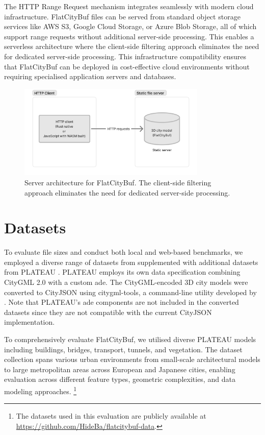 The HTTP Range Request mechanism integrates seamlessly with modern cloud infrastructure. FlatCityBuf files can be served from standard object storage services like AWS S3, Google Cloud Storage, or Azure Blob Storage, all of which support range requests without additional server-side processing. This enables a serverless architecture where the client-side filtering approach eliminates the need for dedicated server-side processing. This infrastructure compatibility ensures that FlatCityBuf can be deployed in cost-effective cloud environments without requiring specialised application servers and databases.

\begin{figure}[ht]
  \centering
  \includegraphics[width=0.8\textwidth]{figs/result_analysis/server_architecture_fcb.png}
  \caption{Server architecture for FlatCityBuf. The client-side filtering approach eliminates the need for dedicated server-side processing.}
  \label{fig:result:cross_platform_implementation:server_architecture}
\end{figure}
\section{Datasets}
\label{result:dataset}

To evaluate file sizes and conduct both local and web-based benchmarks, we employed a diverse range of datasets from \citet{ledoux_2024} supplemented with additional datasets from PLATEAU \citep{plateau}. PLATEAU employs its own data specification combining CityGML 2.0 \citep{CityGML} with a custom \ac{ade}. The CityGML-encoded 3D city models were converted to CityJSON using citygml-tools, a command-line utility developed by \citet{citygml_tools}. Note that PLATEAU's \ac{ade} components are not included in the converted datasets since they are not compatible with the current CityJSON implementation.

To comprehensively evaluate FlatCityBuf, we utilised diverse PLATEAU models including buildings, bridges, transport, tunnels, and vegetation. The dataset collection spans various urban environments from small-scale architectural models to large metropolitan areas across European and Japanese cities, enabling evaluation across different feature types, geometric complexities, and data modeling approaches. \footnote{The datasets used in this evaluation are publicly available at \url{https://github.com/HideBa/flatcitybuf-data}.}

